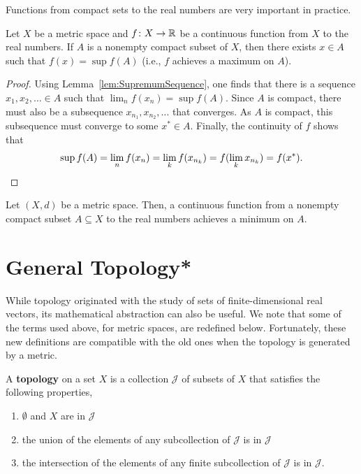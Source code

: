 Functions from compact sets to the real numbers are very important in practice.

\begin{theorem}
Let $X$ be a metric space and $f \colon X\rightarrow \mathbb{R}$ be a continuous function from $X$ to the real numbers.
If $A$ is a nonempty compact subset of $X$, then there exists $x\in A$ such that $f(x)=\sup f(A)$ (i.e., $f$ achieves a maximum on $A$).
\end{theorem}
\begin{proof}
Using Lemma~\ref{lem:SupremumSequence}, one finds that there is a sequence $x_1,x_2,\ldots \in A$ such that $\lim_n f(x_n) = \sup f(A)$.
Since $A$ is compact, there must also be a subsequence $x_{n_1},x_{n_2},\ldots$ that converges.
As $A$ is compact, this subsequence must converge to some $x^* \in A$.
Finally, the continuity of $f$ shows that
\[\sup f(A) = \lim_n f(x_n) = \lim_k f(x_{n_k}) = f(\lim_k x_{n_k}) = f(x^*). \qedhere \]
\end{proof}

\begin{corollary}
Let $(X,d)$ be a metric space.
Then, a continuous function from a nonempty compact subset $A\subseteq X$ to the real numbers achieves a minimum on $A$.
\end{corollary}



\section{General Topology*}

While topology originated with the study of sets of finite-dimensional real vectors, its mathematical abstraction can also be useful.
We note that some of the terms used above, for metric spaces, are redefined below.
Fortunately, these new definitions are compatible with the old ones when the topology is generated by a metric.

\begin{definition}
A \textbf{topology} on a set $X$ is a collection $\mathcal{J}$ of subsets of $X$ that satisfies the following properties,
\begin{enumerate}
\item $\emptyset$ and $X$ are in $\mathcal{J}$
\item the union of the elements of any subcollection of $\mathcal{J}$ is in $\mathcal{J}$
\item the intersection of the elements of any finite subcollection of $\mathcal{J}$ is in $\mathcal{J}$.
\end{enumerate}
\end{definition}

